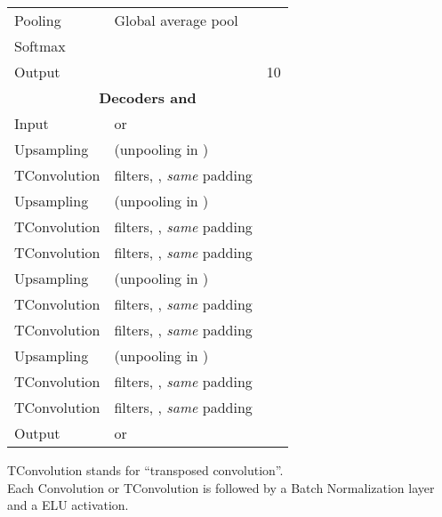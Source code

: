 \documentclass[runningheads]{llncs}
\begin{document}
\begin{table}[htbp]
\begin{threeparttable}
\begin{tabular}{ l l l}
Pooling & Global average pool &  \\
Softmax &   &  \\
Output &  & 10 \\
\toprule
\multicolumn{3}{c}{\textbf{Decoders  and }}\\
\midrule
Input &  or  &  \\
Upsampling   &  (unpooling in )  &  \\
TConvolution &  filters, , \textit{same} padding  &  \\
Upsampling   &  (unpooling in )  &  \\
TConvolution &  filters, , \textit{same} padding  &  \\
TConvolution &  filters, , \textit{same} padding  &  \\
Upsampling   &  (unpooling in )  &  \\
TConvolution &  filters, , \textit{same} padding  &  \\
TConvolution &  filters, , \textit{same} padding  &  \\
Upsampling   &  (unpooling in )  &  \\
TConvolution &  filters, , \textit{same} padding  &  \\
TConvolution &  filters, , \textit{same} padding  &  \\
Output &  or  &  \\
\bottomrule
\end{tabular}
\begin{tablenotes}
TConvolution stands for ``transposed convolution''.\\ Each Convolution or TConvolution is followed by a Batch Normalization layer and a ELU activation.
\end{tablenotes}
\end{threeparttable}
\end{table}
\end{document}
